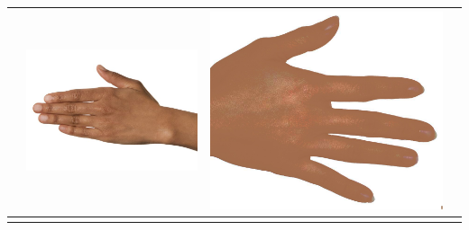 \begin{longtable}{|N||c|c|c|}
\begin{minipage}{.29\textwidth}
  \end{minipage} & 
  \begin{minipage}{.29\textwidth}
    \includegraphics[width=\textwidth,height=\textheight,keepaspectratio]{../inputs/hand_brown.jpg}
  \end{minipage} & 
  \begin{minipage}{.29\textwidth}
    \includegraphics[width=\textwidth,height=\textheight,keepaspectratio]{../rc_test/outputs/20170517_proportional_corrected_test_alpha10/hand_light_to_hand_brown.jpg}
  \end{minipage} \\
\hline  \label{row:prop_correct_test_a10_hand_light_to_hand_pale} &

\end{longtable}
